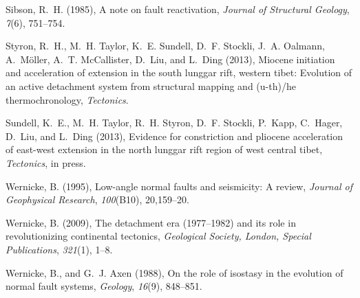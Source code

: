 \documentclass[twocolumn,grl]{AGUTeX}
\begin{document}
\begin{article}
\begin{thebibliography}{25}
Sibson, R.~H. (1985), A note on fault reactivation, \textit{Journal of
  Structural Geology}, \textit{7}(6), 751--754.

Styron, R.~H., M.~H. Taylor, K.~E. Sundell, D.~F. Stockli, J.~A. Oalmann,
  A.~M{\"o}ller, A.~T. McCallister, D.~Liu, and L.~Ding (2013), Miocene
  initiation and acceleration of extension in the south lunggar rift, western
  tibet: Evolution of an active detachment system from structural mapping and
  (u-th)/he thermochronology, \textit{Tectonics}.

Sundell, K.~E., M.~H. Taylor, R.~H. Styron, D.~F. Stockli, P.~Kapp, C.~Hager,
  D.~Liu, and L.~Ding (2013), Evidence for constriction and pliocene
  acceleration of east-west extension in the north lunggar rift region of west
  central tibet, \textit{Tectonics}, in press.

Wernicke, B. (1995), Low-angle normal faults and seismicity: A review,
  \textit{Journal of Geophysical Research}, \textit{100}(B10), 20,159--20.

Wernicke, B. (2009), The detachment era (1977--1982) and its role in
  revolutionizing continental tectonics, \textit{Geological Society, London,
  Special Publications}, \textit{321}(1), 1--8.

Wernicke, B., and G.~J. Axen (1988), On the role of isostasy in the evolution
  of normal fault systems, \textit{Geology}, \textit{16}(9), 848--851.

\end{thebibliography}


\end{article}


%
%
\end{document}
